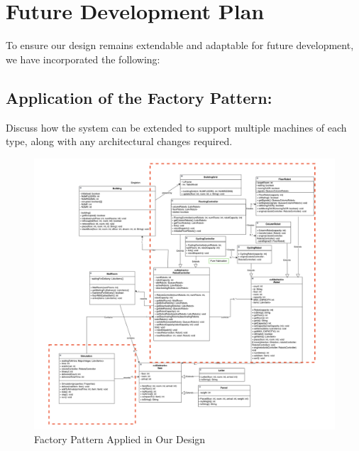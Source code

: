 \documentclass[12pt]{article}
\begin{document}

\newpage

\section{Future Development Plan}
\setlength{\parindent}{2em} 
To ensure our design remains extendable and adaptable for future development, we have incorporated the following:

\subsection{Application of the Factory Pattern:}
Discuss how the system can be extended to support multiple machines of each type, along with any architectural changes required.
\begin{figure}[H]
    \centering
    \includegraphics[width=1\linewidth]{Factory Pattern.png}
    \caption{Factory Pattern Applied in Our Design}
    \label{fig:enter-label}
\end{figure}
\end{document}
